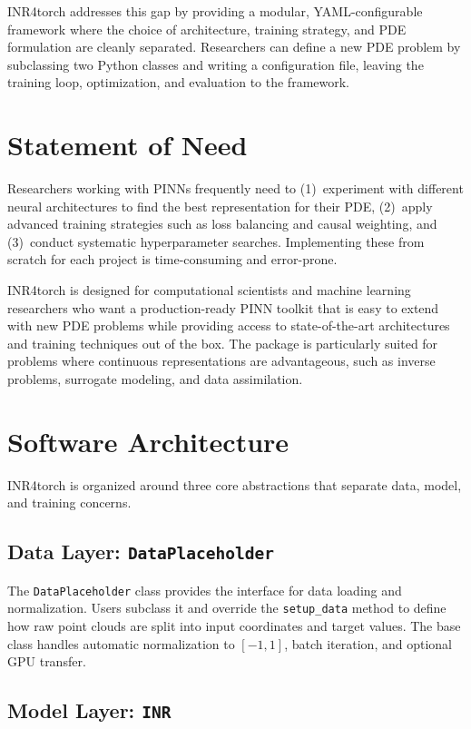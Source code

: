 \documentclass[11pt,a4paper]{article}
\begin{document}
INR4torch addresses this gap by providing a modular, YAML-configurable framework where the choice of architecture, training strategy, and PDE formulation are cleanly separated. Researchers can define a new PDE problem by subclassing two Python classes and writing a configuration file, leaving the training loop, optimization, and evaluation to the framework.

\section{Statement of Need}

Researchers working with PINNs frequently need to (1)~experiment with different neural architectures to find the best representation for their PDE, (2)~apply advanced training strategies such as loss balancing and causal weighting, and (3)~conduct systematic hyperparameter searches. Implementing these from scratch for each project is time-consuming and error-prone.

INR4torch is designed for computational scientists and machine learning researchers who want a production-ready PINN toolkit that is easy to extend with new PDE problems while providing access to state-of-the-art architectures and training techniques out of the box. The package is particularly suited for problems where continuous representations are advantageous, such as inverse problems, surrogate modeling, and data assimilation.

\section{Software Architecture}

INR4torch is organized around three core abstractions that separate data, model, and training concerns.

\subsection{Data Layer: \texttt{DataPlaceholder}}

The \texttt{DataPlaceholder} class provides the interface for data loading and normalization. Users subclass it and override the \texttt{setup\_data} method to define how raw point clouds are split into input coordinates and target values. The base class handles automatic normalization to $[-1, 1]$, batch iteration, and optional GPU transfer.

\subsection{Model Layer: \texttt{INR}}
\end{document}
